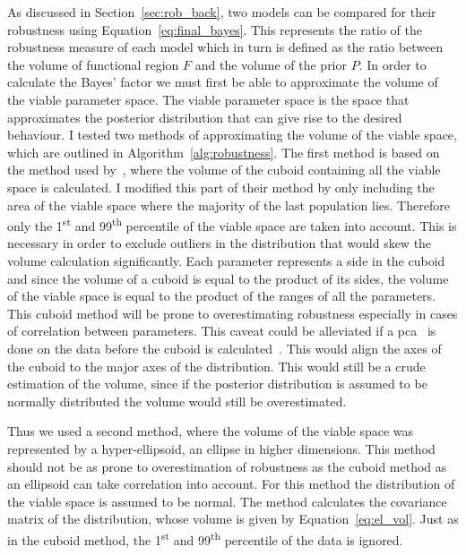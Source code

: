 As discussed in Section~\ref{sec:rob_back}, two models can be compared for their robustness using Equation~\ref{eq:final_bayes}. This represents the ratio of the robustness measure of each model which in turn is defined as the ratio between the volume of functional region $F$ and the volume of the prior $P$. In order to calculate the Bayes' factor we must first be able to approximate the volume of the viable parameter space. The viable parameter space is the space that approximates the posterior distribution that can give rise to the desired behaviour. I tested two methods of approximating the volume of the viable space, which are outlined in Algorithm~\ref{alg:robustness}. The first method is based on the method used by~\autocite{Hafner:2009ct}, where the volume of the cuboid containing all the viable space is calculated. I modified this part of their method by only including the area of the viable space where the majority of the last population lies. Therefore only the 1\textsuperscript{st} and 99\textsuperscript{th} percentile of the viable space are taken into account. This is necessary in order to exclude outliers in the distribution that would skew the volume calculation significantly. Each parameter represents a side in the cuboid and since the volume of a cuboid is equal to the product of its sides, the volume of the viable space is equal to the product of the ranges of all the parameters. This cuboid method will be prone to overestimating robustness especially in cases of correlation between parameters. This caveat could be alleviated if a \acrfull{pca}~\autocite{Fukunaga:2013wt} is done on the data before the cuboid is calculated~\autocite{Hafner:2009ct}. This would align the axes of the cuboid to the major axes of the distribution. This would still be a crude estimation of the volume, since if the posterior distribution is assumed to be normally distributed the volume would still be overestimated. 

Thus we used a second method, where the volume of the viable space was represented by a hyper-ellipsoid, an ellipse in higher dimensions. This method should not be as prone to overestimation of robustness as the cuboid method as an ellipsoid can take correlation into account. For this method the distribution of the viable space is assumed to be normal. The method calculates the covariance matrix of the distribution, whose volume is given by Equation~\ref{eq:el_vol}. Just as in the cuboid method, the 1\textsuperscript{st} and 99\textsuperscript{th} percentile of the data is ignored. 

